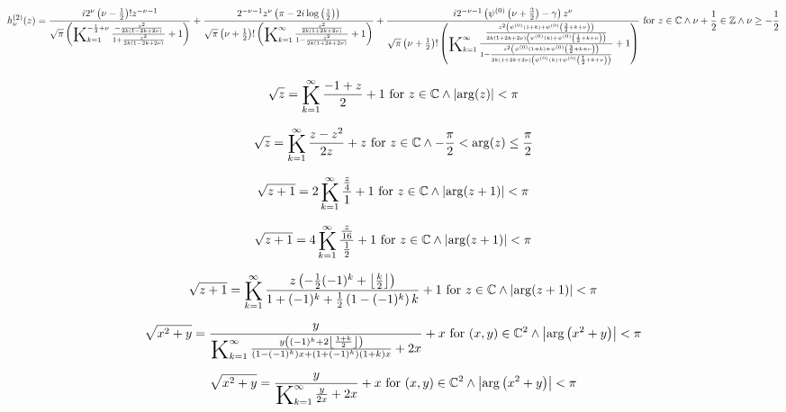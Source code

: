 \documentclass{article}
\newcommand{\bigK}{\mathop{\raisebox{-5pt}{\huge K}}}
\begin{document}
\[h_{\nu }^{(2)}(z)=\frac{i 2^{\nu } \left(\nu -\frac{1}{2}\right)! z^{-\nu -1}}{\sqrt{\pi } \left(\bigK_{k=1}^{-\frac{1}{2}+\nu}\frac{-\frac{z^2}{2 k (1-2 k+2 \nu )}}{1+\frac{z^2}{2 k (1-2 k+2 \nu )}}+1\right)}+\frac{2^{-\nu -1} z^{\nu } \left(\pi -2 i \log \left(\frac{z}{2}\right)\right)}{\sqrt{\pi } \left(\nu +\frac{1}{2}\right)! \left(\bigK_{k=1}^{\infty}\frac{\frac{z^2}{2 k (1+2 k+2 \nu )}}{1-\frac{z^2}{2 k (1+2 k+2 \nu )}}+1\right)}+\frac{i 2^{-\nu -1} \left(\psi ^{(0)}\left(\nu +\frac{3}{2}\right)-\gamma \right) z^{\nu }}{\sqrt{\pi } \left(\nu +\frac{1}{2}\right)! \left(\bigK_{k=1}^{\infty}\frac{\frac{z^2 \left(\psi ^{(0)}(1+k)+\psi ^{(0)}\left(\frac{3}{2}+k+\nu \right)\right)}{2 k (1+2 k+2 \nu ) \left(\psi ^{(0)}(k)+\psi ^{(0)}\left(\frac{1}{2}+k+\nu \right)\right)}}{1-\frac{z^2 \left(\psi ^{(0)}(1+k)+\psi ^{(0)}\left(\frac{3}{2}+k+\nu \right)\right)}{2 k (1+2 k+2 \nu ) \left(\psi ^{(0)}(k)+\psi ^{(0)}\left(\frac{1}{2}+k+\nu \right)\right)}}+1\right)}\text{ for }z\in \mathbb{C}\land \nu +\frac{1}{2}\in \mathbb{Z}\land \nu \geq -\frac{1}{2}\] 

\[\sqrt{z}=\bigK_{k=1}^{\infty}\frac{-1+z}{2}+1\text{ for }z\in \mathbb{C}\land \left| \arg (z)\right| <\pi\] 

\[\sqrt{z}=\bigK_{k=1}^{\infty}\frac{z-z^2}{2 z}+z\text{ for }z\in \mathbb{C}\land -\frac{\pi }{2}<\arg (z)\leq \frac{\pi }{2}\] 

\[\sqrt{z+1}=2 \bigK_{k=1}^{\infty}\frac{\frac{z}{4}}{1}+1\text{ for }z\in \mathbb{C}\land \left| \arg (z+1)\right| <\pi\] 

\[\sqrt{z+1}=4 \bigK_{k=1}^{\infty}\frac{\frac{z}{16}}{\frac{1}{2}}+1\text{ for }z\in \mathbb{C}\land \left| \arg (z+1)\right| <\pi\] 

\[\sqrt{z+1}=\bigK_{k=1}^{\infty}\frac{z \left(-\frac{1}{2} (-1)^k+\left\lfloor \frac{k}{2}\right\rfloor \right)}{1+(-1)^k+\frac{1}{2} \left(1-(-1)^k\right) k}+1\text{ for }z\in \mathbb{C}\land \left| \arg (z+1)\right| <\pi\] 

\[\sqrt{x^2+y}=\frac{y}{\bigK_{k=1}^{\infty}\frac{y \left((-1)^k+2 \left\lfloor \frac{1+k}{2}\right\rfloor \right)}{\left(1-(-1)^k\right) x+\left(1+(-1)^k\right) (1+k) x}+2 x}+x\text{ for }(x,y)\in \mathbb{C}^2\land \left| \arg \left(x^2+y\right)\right| <\pi\] 

\[\sqrt{x^2+y}=\frac{y}{\bigK_{k=1}^{\infty}\frac{y}{2 x}+2 x}+x\text{ for }(x,y)\in \mathbb{C}^2\land \left| \arg \left(x^2+y\right)\right| <\pi\] 
\end{document}

